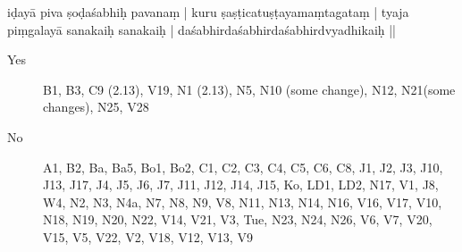 \begin{ekdosis}
\begin{marma}[hp01_055]
\begin{marma}[hp02_009]
      \begin{marma}[hp02_011]
        iḍayā piva ṣoḍaśabhiḥ pavanaṃ |
        kuru ṣaṣṭicatuṣṭayamaṃtagataṃ |
        tyaja piṃgalayā sanakaiḥ sanakaiḥ |
        daśabhirdaśabhirdaśabhirdvyadhikaiḥ ||
        \begin{description}
        \item[Yes] B1, B3, C9 (2.13), V19, N1 (2.13), N5, N10 (some change), N12, N21(some changes), N25, V28
        \item[No] A1, B2, Ba, Ba5, Bo1, Bo2, C1, C2, C3, C4, C5, C6, C8, J1, J2, J3, J10, J13, J17, J4, J5, J6, J7, J11, J12, J14, J15, Ko, LD1, LD2, N17, V1, J8, W4, N2, N3, N4a, N7, N8, N9, V8, N11, N13, N14, N16, V16, V17, V10, N18, N19, N20, N22, V14, V21, V3, Tue, N23, N24, N26, V6, V7, V20, V15, V5, V22, V2, V18, V12, V13, V9
        \end{description}



\end{marma}
\end{marma}
\end{marma}
\end{ekdosis}
